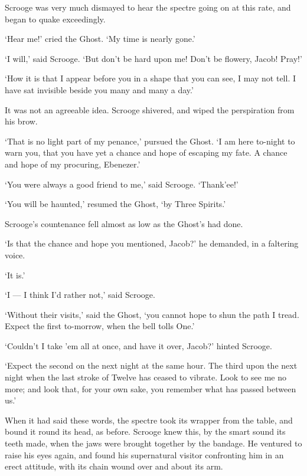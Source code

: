 \documentclass[11pt,twoside]{article}\makeatletter
\begin{document}
Scrooge was very much dismayed to hear the spectre going on at this rate, and began to quake exceedingly.   \par
‘Hear me!’ cried the Ghost.  ‘My time is nearly gone.’  \par
‘I will,’ said Scrooge.  ‘But don't be hard upon me! Don't be flowery, Jacob!  Pray!’  \par
           ‘How it is that I appear before you in a shape that you can see, I may not tell.  I have sat invisible beside you many and many a day.’         \par
It was not an agreeable idea.  Scrooge shivered, and wiped the perspiration from his brow.  \par
‘That is no light part of my penance,’ pursued the Ghost.  ‘I am here to-night to warn you, that you have yet a chance and hope of escaping my fate.  A chance and hope of my procuring, Ebenezer.’  \par
‘You were always a good friend to me,’ said Scrooge.  ‘Thank'ee!’  \par
‘You will be haunted,’ resumed the Ghost, ‘by Three Spirits.’  \par
Scrooge's countenance fell almost as low as the Ghost's had done.  \par
‘Is that the chance and hope you mentioned, Jacob?’ he demanded, in a faltering voice.  \par
           ‘It is.’         \par
‘I — I think I'd rather not,’ said Scrooge.   \par
‘Without their visits,’ said the Ghost, ‘you cannot hope to shun the path I tread.  Expect the first to-morrow, when the bell tolls One.’  \par
‘Couldn't I take 'em all at once, and have it over, Jacob?’ hinted Scrooge.  \par
           ‘Expect the second on the next night at the same hour. The third upon the next night when the last stroke of Twelve has ceased to vibrate.  Look to see me no more; and look that, for your own sake, you remember what has passed between us.’         \par
When it had said these words, the spectre took its wrapper from the table, and bound it round its head, as before. Scrooge knew this, by the smart sound its teeth made, when the jaws were brought together by the bandage.  He ventured to raise his eyes again, and found his supernatural visitor confronting him in an erect attitude, with its chain wound over and about its arm.  \par
\end{document}

